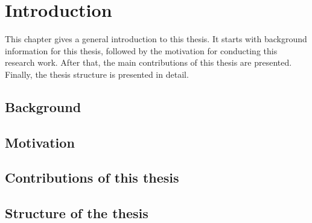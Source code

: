 \setcounter{chapter}{2}
\chapter{Introduction}
\normalsize
\label{ch1}
	\minitoc
	\clearpage
	
This chapter gives a general introduction to this thesis. It starts with background information for this thesis, followed by the motivation for conducting this research work. After that, the main contributions of this thesis are presented. Finally, the thesis structure is presented in detail.

\section{Background}

\section{Motivation}

\section{Contributions of this thesis}

\section{Structure of the thesis}